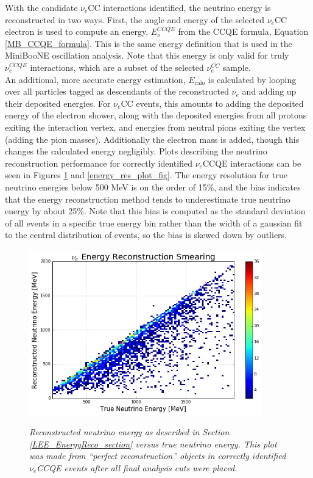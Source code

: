With the candidate $\nu_e$CC interactions identified, the neutrino energy is reconstructed in two ways. First, the angle and energy of the selected $\nu_e$CC electron is used to compute an energy, $E_\nu^{CCQE}$ from the CCQE formula, Equation \ref{MB_CCQE_formula}. This is the same energy definition that is used in the MiniBooNE oscillation analysis. Note that this energy is only valid for truly $\nu_e^{CCQE}$ interactions, which are a subset of the selected $\nu_e^{CC}$ sample.\\

An additional, more accurate energy estimation, $E_{\text{calo}}$ is calculated by looping over all particles tagged as descendants of the reconstructed $\nu_e$ and adding up their deposited energies. For $\nu_e$CC events, this amounts to adding the deposited energy of the electron shower, along with the deposited energies from all protons exiting the interaction vertex, and energies from neutral pions exiting the vertex (adding the pion masses). Additionally the electron mass is added, though this changes the calculated energy negligibly. Plots describing the neutrino reconstruction performance for correctly identified $\nu_e$CCQE interactions can be seen in Figures \ref{energy_smear_plot_fig} and \ref{energy_res_plot_fig}. The energy resolution for true neutrino energies below 500 MeV is on the order of 15\%, and the bias indicates that the energy reconstruction method tends to underestimate true neutrino energy by about 25\%. Note that this bias is computed as the standard deviation of all events in a specific true energy bin rather than the width of a gaussian fit to the central distribution of events, so the bias is skewed down by outliers.

\begin{figure}[ht!]
\centering
\includegraphics[width=0.9\textwidth]{Figures/LEE_EnergySmear_WithAnalysisCuts.png}\\%
\caption{\textit{Reconstructed neutrino energy as described in Section \ref{LEE_EnergyReco_section} versus true neutrino energy. This plot was made from ``perfect reconstruction'' objects in correctly identified $\nu_e$CCQE events after all final analysis cuts were placed.}}
\label{energy_smear_plot_fig}
\end{figure}


